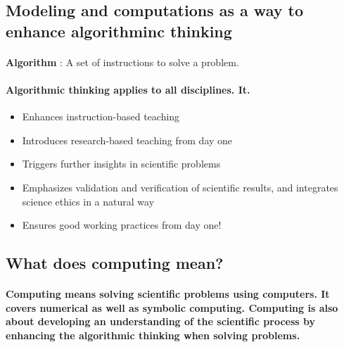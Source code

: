 \documentclass[%
twoside,                 %
final,                   %
10pt]{article}
\begin{document}
\noindent



\subsection{Modeling and computations as a way to enhance algorithminc thinking}


\paragraph{}
\textbf{Algorithm} :
A set of instructions to solve a problem.




\paragraph{Algorithmic thinking applies to all disciplines. It.}
\begin{itemize}
\item Enhances instruction-based teaching

\item Introduces research-based teaching  from day one

\item Triggers further insights in scientific problems

\item Emphasizes validation and verification of scientific results, and integrates science ethics in a natural way

\item Ensures good working practices from day one!
\end{itemize}

\noindent





\subsection{What does computing mean?}


\paragraph{}

\textbf{Computing means solving scientific problems using computers. It covers numerical as well as symbolic computing. Computing is also about developing an understanding of the scientific process by enhancing the algorithmic thinking when solving problems.}
\end{document}

